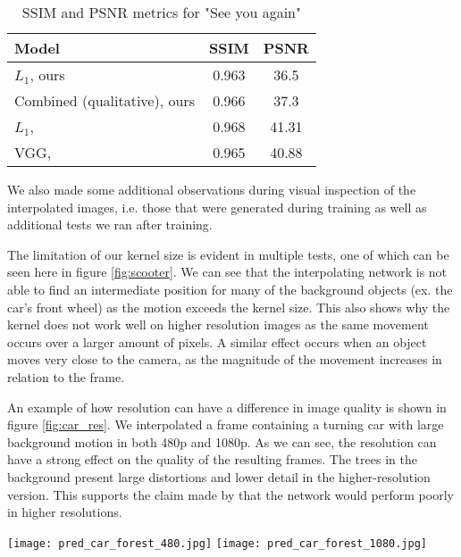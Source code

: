 \documentclass[10pt,twocolumn,letterpaper]{article}
\begin{document}
\begin{table}[h]
\centering
\begin{tabular}{|l|c|c|}
\hline
	Model & SSIM & PSNR \\
	\hline
$L_1$, ours                         & 0.963   & 36.5  \\
Combined (qualitative), ours        & 0.966   & 37.3  \\
$L_1$, \citeauthor{AdapConv}        & 0.968   & 41.31 \\
VGG, \citeauthor{AdapConv}          & 0.965   & 40.88 \\
	\hline
\end{tabular}
\vspace{1em}
\caption{SSIM and PSNR metrics for "See you again"}
\label{table:comparisonKhalifa}
\end{table}

We also made some additional observations during visual inspection of the interpolated images, i.e. those that were generated during training as well as additional tests we ran after training.

The limitation of our kernel size is evident in multiple tests, one of which can be seen here in figure \ref{fig:scooter}. We can see that the interpolating network is not able to find an intermediate position for many of the background objects (ex. the car's front wheel) as the motion exceeds the kernel size. This also shows why the kernel does not work well on higher resolution images as the same movement occurs over a larger amount of pixels. A similar effect occurs when an object moves very close to the camera, as the magnitude of the movement increases in relation to the frame.

An example of how resolution can have a difference in image quality is shown in figure \ref{fig:car_res}. We interpolated a frame containing a turning car with large background motion in both 480p and 1080p. As we can see, the resolution can have a strong effect on the quality of the resulting frames. The trees in the background present large distortions and lower detail in the higher-resolution version. This supports the claim made by \citeauthor{AdapConv} that the network would perform poorly in higher resolutions.

\begin{figure*}
    \begin{center}
    	\texttt{[image: pred\_car\_forest\_480.jpg]}
	    \texttt{[image: pred\_car\_forest\_1080.jpg]}
	    \\\vspace{0.2em}
    \end{center}
    \caption{Interpolated frames from 480p (left) and 1080p (right) of "Car turn" from DAVIS 17, using the combined loss model.}
    \label{fig:car_res}
\end{figure*}
\end{document}
